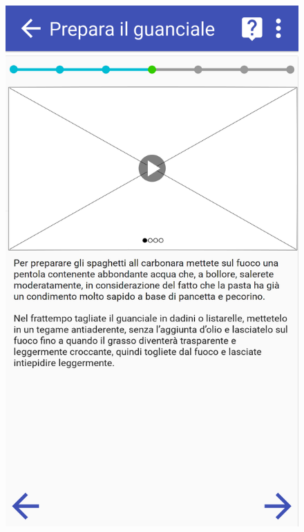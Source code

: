 \begin{figure}[H]
\begin{minipage}{.49\textwidth}
		\includegraphics[width=\textwidth]{img/wireframe/presentazione_passo_ricetta.png}
	\end{minipage}
\end{figure}
